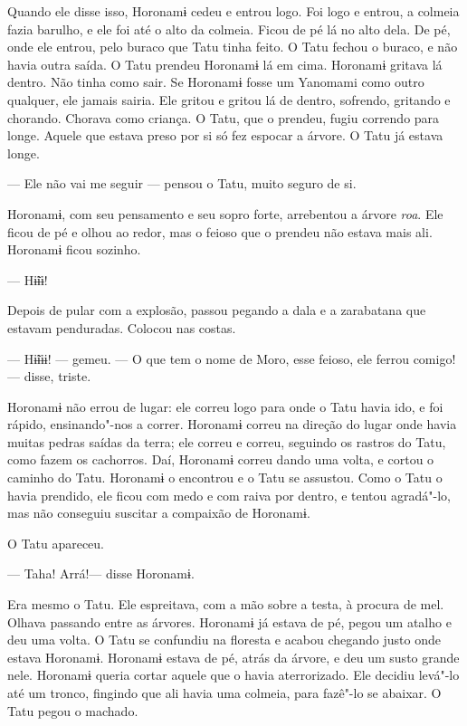 Quando ele disse isso, Horonamɨ cedeu e entrou logo. Foi logo e entrou,
a colmeia fazia barulho, e ele foi até o alto da colmeia. Ficou de pé lá
no alto dela. De pé, onde ele entrou, pelo buraco que Tatu tinha feito.
O Tatu fechou o buraco, e não havia outra saída. O Tatu prendeu Horonamɨ
lá em cima. Horonamɨ gritava lá dentro. Não tinha como sair. Se Horonamɨ
fosse um Yanomami como outro qualquer, ele jamais sairia. Ele gritou e
gritou lá de dentro, sofrendo, gritando e chorando. Chorava como
criança. O Tatu, que o prendeu, fugiu correndo para longe. Aquele que
estava preso por si só fez espocar a árvore. O Tatu já estava longe. 

--- Ele não vai me seguir --- pensou o Tatu, muito seguro de si. 

Horonamɨ, com seu pensamento e seu sopro forte, arrebentou a
árvore \emph{roa}. Ele ficou de pé e olhou ao redor, mas o feioso que o
prendeu não estava mais ali. Horonamɨ ficou sozinho. 

--- Hɨ̃ɨɨ! 

Depois de pular com a explosão, passou pegando a dala e a zarabatana que
estavam penduradas. Colocou nas costas. 

--- Hɨ̃ɨɨɨ! --- gemeu. --- O que tem o nome de Moro, esse feioso,
ele ferrou comigo! --- disse, triste.

Horonamɨ não errou de lugar: ele correu logo para onde o Tatu havia ido,
e foi rápido, ensinando"-nos a correr. Horonamɨ correu na direção do
lugar onde havia muitas pedras saídas da terra; ele correu e correu,
seguindo os rastros do Tatu, como fazem os cachorros. Daí, Horonamɨ
correu dando uma volta, e cortou o caminho do Tatu. Horonamɨ o
encontrou e o Tatu se assustou. Como o Tatu o havia prendido, ele ficou
com medo e com raiva por dentro, e tentou agradá"-lo, mas não conseguiu
suscitar a compaixão de Horonamɨ. 

O Tatu apareceu.

--- Taha! Arrá!--- disse Horonamɨ. 

Era mesmo o Tatu. Ele espreitava, com a mão sobre a testa, à procura de
mel. Olhava passando entre as árvores. Horonamɨ já estava de pé, pegou
um atalho e deu uma volta. O Tatu se confundiu na floresta e acabou
chegando justo onde estava Horonamɨ. Horonamɨ estava de pé, atrás da
árvore, e deu um susto grande nele. Horonamɨ queria cortar aquele que o
havia aterrorizado. Ele decidiu levá"-lo até um tronco, fingindo que ali
havia uma colmeia, para fazê"-lo se abaixar. O Tatu pegou o machado. 

